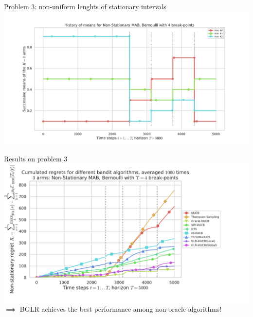 \documentclass[11pt,english,ignorenonframetext,]{beamer}
\begin{document}
\begin{frame}[plain]{Problem 3: non-uniform lenghts of stationary intervals}
  \centering
  \includegraphics[width=1.15\textwidth]{figures/Problem_4.pdf}
\end{frame}

\begin{frame}[plain]{Results on problem 3}
  \centering
  \includegraphics[width=1.15\textwidth]{figures/regret_problem4.pdf}
  $\implies$ BGLR achieves the best performance among non-oracle algorithms!
\end{frame}
\end{document}
